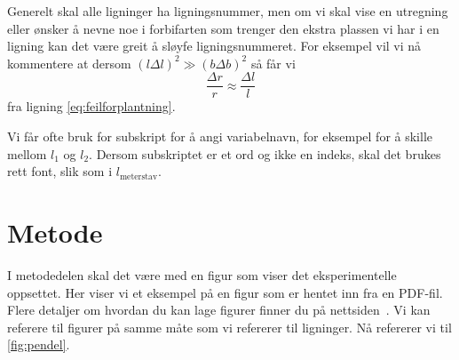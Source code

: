 
Generelt skal alle ligninger ha ligningsnummer, men om vi skal vise en utregning eller ønsker å nevne noe i forbifarten som trenger den ekstra plassen vi har i en ligning kan det være greit å sløyfe ligningsnummeret. For eksempel vil vi nå kommentere at dersom $(l \Delta l)^2 \gg (b \Delta b)^2$ så får vi
\begin{equation*}
\frac{\Delta r}{r}\approx\frac{\Delta l}{l}
\end{equation*}
fra ligning \eqref{eq:feilforplantning}. 


Vi får ofte bruk for subskript for å angi variabelnavn, for eksempel for å skille mellom $l_1$ og $l_2$. Dersom subskriptet er et ord og ikke en indeks, skal det brukes rett font, slik som i $l_\text{meterstav}$.



\section{Metode}
I metodedelen skal det være med en figur som viser det eksperimentelle oppsettet. Her viser vi et eksempel på en figur som er hentet inn fra en PDF-fil. Flere detaljer om hvordan du kan lage figurer finner du på nettsiden~\cite{labside}. Vi kan referere til figurer på samme måte som vi refererer til ligninger. Nå refererer vi til \autoref{fig:pendel}.

